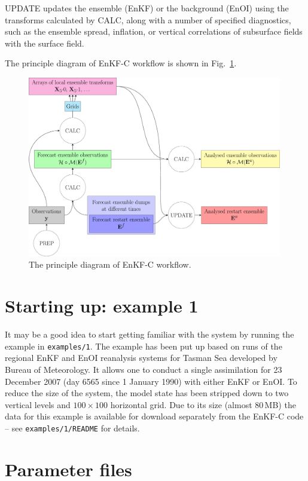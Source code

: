\documentclass[11pt]{report}
\begin{document}
UPDATE updates the ensemble (EnKF) or the background (EnOI) using the transforms calculated by CALC, along with a number of specified diagnostics, such as the ensemble spread, inflation, or vertical correlations of subsurface fields with the surface field.

The principle diagram of EnKF-C workflow is shown in Fig.~\ref{fig:calcupdate}.
\begin{figure}
  \centering
  \includegraphics[width = 0.99\textwidth]{plots/enkfc.pdf}
  \caption{The principle diagram of EnKF-C workflow.}
  \label{fig:calcupdate}
\end{figure}

\section{Starting up: example 1}
\label{example1}

It may be a good idea to start getting familiar with the system by running the example in \verb|examples/1|.
The example has been put up based on runs of the regional EnKF and EnOI reanalysis systems for Tasman Sea developed by Bureau of Meteorology. 
It allows one to conduct a single assimilation for 23 December 2007 (day 6565 since 1 January 1990) with either EnKF or EnOI.
To reduce the size of the system, the model state has been stripped down to two vertical levels and $100 \times 100$ horizontal grid.
Due to its size (almost 80\,MB) the data for this example is available for download separately from the EnKF-C code -- see \verb|examples/1/README| for details.

\section{Parameter files}
\end{document}
